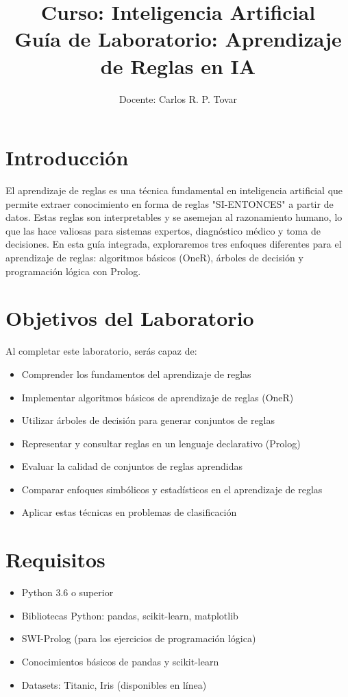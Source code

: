 \documentclass[a4paper,12pt]{article}
\title{Curso: Inteligencia Artificial \\Guía de Laboratorio: Aprendizaje de Reglas en IA}
\author{Docente: Carlos R. P. Tovar}
\date{}
\begin{document}
\maketitle

\section{Introducción}
El aprendizaje de reglas es una técnica fundamental en inteligencia artificial que permite extraer conocimiento en forma de reglas "SI-ENTONCES" a partir de datos. Estas reglas son interpretables y se asemejan al razonamiento humano, lo que las hace valiosas para sistemas expertos, diagnóstico médico y toma de decisiones. En esta guía integrada, exploraremos tres enfoques diferentes para el aprendizaje de reglas: algoritmos básicos (OneR), árboles de decisión y programación lógica con Prolog.

\section{Objetivos del Laboratorio}
Al completar este laboratorio, serás capaz de:
\begin{itemize}
    \item Comprender los fundamentos del aprendizaje de reglas
    \item Implementar algoritmos básicos de aprendizaje de reglas (OneR)
    \item Utilizar árboles de decisión para generar conjuntos de reglas
    \item Representar y consultar reglas en un lenguaje declarativo (Prolog)
    \item Evaluar la calidad de conjuntos de reglas aprendidas
    \item Comparar enfoques simbólicos y estadísticos en el aprendizaje de reglas
    \item Aplicar estas técnicas en problemas de clasificación
\end{itemize}

\section{Requisitos}
\begin{itemize}
    \item Python 3.6 o superior
    \item Bibliotecas Python: pandas, scikit-learn, matplotlib
    \item SWI-Prolog (para los ejercicios de programación lógica)
    \item Conocimientos básicos de pandas y scikit-learn
    \item Datasets: Titanic, Iris (disponibles en línea)
\end{itemize}
\end{document}
